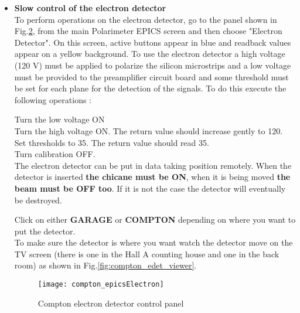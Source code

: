 {\begin{itemize}
 \begin{figure}[htp]
    \begin{center}
        \texttt{[image: compton\_edet\_crate]}
    \end{center}
    \caption[compton:electron detector crate]{
            The Compton electron detector instrumentation crate supplying low voltage, high voltage, motion control, and FSD logic to the electron deterctor.}
    \label{fig:compton_edet_crate}
 \end{figure}

\item {\bf Slow control of the electron detector }\\
To perform operations on the electron detector, go to the panel shown in Fig.\ref{fig:compton_epicsElectron}, from the main Polarimeter EPICS screen
and then choose "Electron Detector". On this screen, 
 active buttons appear in blue
and readback values appear on a yellow background. 
To use the electron detector a high voltage
(120 V) must be applied to polarize the silicon
microstrips and a low voltage must be provided to the preamplifier
circuit board and some threshold must be set for each plane for
the detection of the signals. To do this execute the following operations :

Turn the low voltage ON\\
Turn the high voltage ON. The return value should increase gently to 120.\\
Set thresholds to 35. The return value should read 35.\\
Turn calibration OFF.\\

The electron detector can be put in data
taking position remotely. When the detector is inserted {\bf the chicane must be ON},
when it is being moved {\bf the beam must be OFF too}. If it is not the case the detector will eventually be destroyed.

Click on either {\bf GARAGE} or {\bf COMPTON} depending on where you want to put the 
detector.\\

To make sure the detector is where you want watch the detector move on the TV screen  (there is one in the Hall A counting house and one in the back room) as shown in Fig.\ref{fig:compton_edet_viewer}.\\
	
\begin{figure}[htp]
    \begin{center}
        \texttt{[image: compton\_epicsElectron]}
    \end{center}
    \caption[compton:Electron detector control]{Compton electron detector control panel}
    \label{fig:compton_epicsElectron}
\end{figure}


\end{itemize}}
